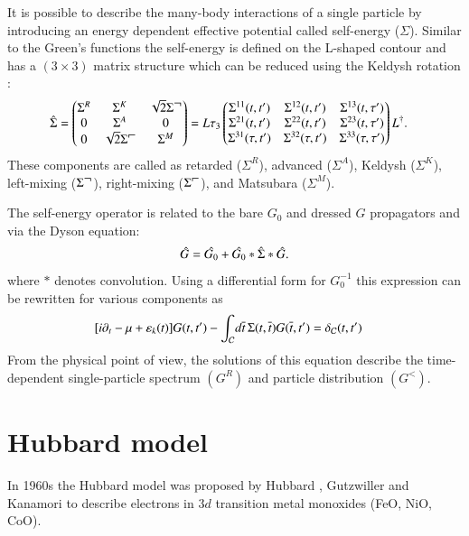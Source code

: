 It is possible to describe the many-body interactions of a single particle by introducing an energy dependent effective potential called self-energy ($\Sigma$). Similar to the Green's functions the self-energy is defined on the L-shaped contour and has a $(3 \times 3)$ matrix structure which can be reduced using the Keldysh rotation \citep{PhysRevB.44.6104}:
\begin{align}
 \hat{\Sigma}
  &=
   \begin{pmatrix}
    \Sigma^{R} & \Sigma^{K} & \sqrt{2} \Sigma^{\lh} \\
    0 & \Sigma^{A} & 0 \\
    0 & \sqrt{2} \Sigma^{\rh} & \Sigma^{M}
   \end{pmatrix}
   =L\tau_3
   \begin{pmatrix}
    \Sigma^{11}(t,t') & \Sigma^{12}(t,t') & \Sigma^{13}(t,\tau ') \\
    \Sigma^{21}(t,t') & \Sigma^{22}(t,t') & \Sigma^{23}(t,\tau ') \\
    \Sigma^{31}(\tau,t') & \Sigma^{32}(\tau,t') & \Sigma^{33}(\tau,\tau')
   \end{pmatrix}L^{\dagger}.
 \label{S 3x3}
\end{align}
These components are called as retarded ($\Sigma^R$), advanced ($\Sigma^A$), Keldysh ($\Sigma^K$), left-mixing ($\Sigma^{\mbox{$\neg$}}$), right-mixing ($\Sigma^{\rh}$), and Matsubara ($\Sigma^M$).

The self-energy operator is related to the bare $G_0$ and dressed $G$ propagators and via the Dyson equation: 
\begin{align}
\label{dyson1}
\hat{G} = \hat{G_0} + \hat{G_0} \ast \hat{\Sigma} \ast \hat{G}.
\end{align}
where $*$ denotes convolution. Using a differential form for $G_0^{-1}$ this expression can be rewritten for various components as
\begin{align}
\label{dyson2}
&[i\partial_t - \mu +\varepsilon_k(t) ] G(t,t') - \int_{\mathcal{C}} \!d\overline t\, \Sigma(t,\overline t) G(\overline t,t') 
= \delta_{\mathcal{C}}(t,t')
\end{align}
From the physical point of view, the solutions of this equation describe the time-dependent single-particle spectrum $(G^R)$ and particle distribution $(G^<)$.


\FloatBarrier

\section{Hubbard model}
\label{section:Hubbard_model}
In 1960s the Hubbard model was proposed by Hubbard \citep{doi:10.1098/rspa.1963.0204}, Gutzwiller \citep{PhysRevLett.10.159} and Kanamori \citep{1963PThPh..30..275K} to describe electrons in $3d$ transition metal monoxides (FeO, NiO, CoO). 

